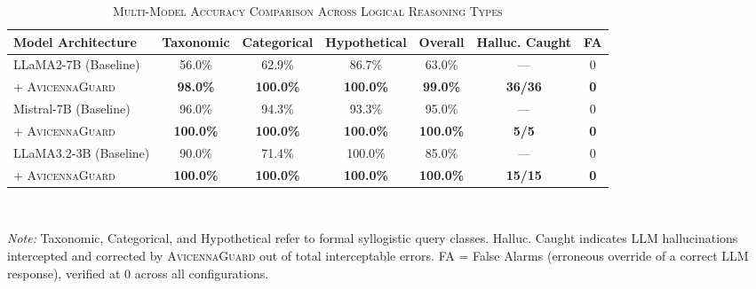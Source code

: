 \begin{table}[t]
\centering
\caption{\textsc{Multi-Model Accuracy Comparison Across Logical Reasoning Types}}
\label{tab:main_results}
\begin{tabular}{lcccccc}
  \toprule
  \textbf{Model Architecture} & \textbf{Taxonomic} & \textbf{Categorical} & \textbf{Hypothetical} & \textbf{Overall} & \textbf{Halluc. Caught} & \textbf{FA} \\
  \midrule
  LLaMA2-7B (Baseline) & 56.0\% & 62.9\% & 86.7\% & 63.0\% & --- & 0 \\
  \quad + \textsc{AvicennaGuard} & \textbf{98.0\%} & \textbf{100.0\%} & \textbf{100.0\%} & \textbf{99.0\%} & \textbf{36/36} & \textbf{0} \\
  \midrule
  Mistral-7B (Baseline) & 96.0\% & 94.3\% & 93.3\% & 95.0\% & --- & 0 \\
  \quad + \textsc{AvicennaGuard} & \textbf{100.0\%} & \textbf{100.0\%} & \textbf{100.0\%} & \textbf{100.0\%} & \textbf{5/5} & \textbf{0} \\
  \midrule
  LLaMA3.2-3B (Baseline) & 90.0\% & 71.4\% & 100.0\% & 85.0\% & --- & 0 \\
  \quad + \textsc{AvicennaGuard} & \textbf{100.0\%} & \textbf{100.0\%} & \textbf{100.0\%} & \textbf{100.0\%} & \textbf{15/15} & \textbf{0} \\
  \bottomrule
\end{tabular}
\vspace{1mm}
\\[-1mm]
\raggedright
\footnotesize{\textit{Note:} Taxonomic, Categorical, and Hypothetical refer to formal syllogistic query classes. Halluc. Caught indicates LLM hallucinations intercepted and corrected by \textsc{AvicennaGuard} out of total interceptable errors. FA = False Alarms (erroneous override of a correct LLM response), verified at 0 across all configurations.}
\end{table}
